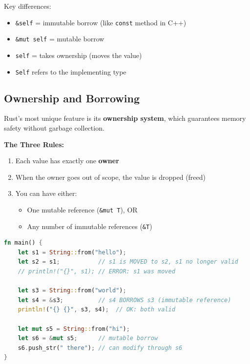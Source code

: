 \documentclass[11pt,a4paper]{article}
\begin{document}
Key differences:
\begin{itemize}
    \item \texttt{\&self} = immutable borrow (like \texttt{const} method in C++)
    \item \texttt{\&mut self} = mutable borrow
    \item \texttt{self} = takes ownership (moves the value)
    \item \texttt{Self} refers to the implementing type
\end{itemize}

\subsection{Ownership and Borrowing}

Rust's most unique feature is its \textbf{ownership system}, which guarantees memory safety without garbage collection.

\textbf{The Three Rules:}
\begin{enumerate}
    \item Each value has exactly one \textbf{owner}
    \item When the owner goes out of scope, the value is dropped (freed)
    \item You can have either:
    \begin{itemize}
        \item One mutable reference (\texttt{\&mut T}), OR
        \item Any number of immutable references (\texttt{\&T})
    \end{itemize}
\end{enumerate}

\begin{lstlisting}[language=Rust]
fn main() {
    let s1 = String::from("hello");
    let s2 = s1;           // s1 is MOVED to s2, s1 no longer valid
    // println!("{}", s1); // ERROR: s1 was moved
    
    let s3 = String::from("world");
    let s4 = &s3;          // s4 BORROWS s3 (immutable reference)
    println!("{} {}", s3, s4);  // OK: both valid
    
    let mut s5 = String::from("hi");
    let s6 = &mut s5;      // mutable borrow
    s6.push_str(" there"); // can modify through s6
}
\end{lstlisting}
\end{document}
